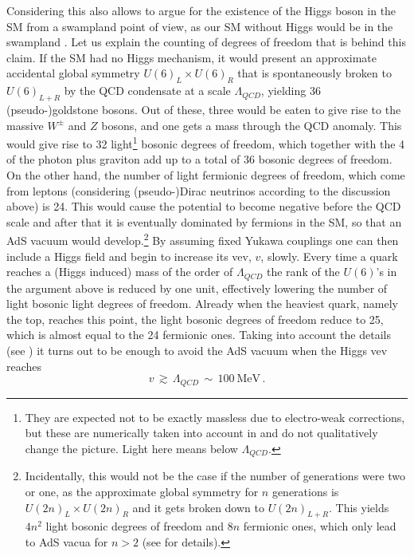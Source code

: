 \documentclass[11pt,a4paper]{article}
\begin{document}
Considering this also allows to argue for the existence of the Higgs boson in the SM from a swampland point of view, as our SM without Higgs would be in the swampland \cite{Gonzalo:2018dxi}. Let us explain the counting of degrees of freedom that is behind this claim. If the SM had no Higgs mechanism, it would present an approximate accidental global symmetry $U(6)_L \times U(6)_R$ that is spontaneously broken to $U(6)_{L+R}$ by the QCD condensate at a scale $\Lambda_{QCD}$, yielding 36 (pseudo-)goldstone bosons. Out of these, three would be eaten to give rise to the massive $W^\pm$ and $Z$ bosons, and one gets a mass through the QCD anomaly. This would give rise to 32 light\footnote{They are expected not to be exactly massless due to electro-weak corrections, but these are numerically taken into account in \cite{Gonzalo:2018dxi} and do not qualitatively change  the picture. Light here means below $\Lambda_{QCD}$.}  bosonic degrees of freedom, which together with the 4 of the photon plus graviton add up to a total of 36 bosonic degrees of freedom. On the other hand, the number of light fermionic degrees of freedom, which come from leptons (considering \mbox{(pseudo-)Dirac} neutrinos according to the discussion above) is 24. This would cause the potential to become negative before the QCD scale and after that it is eventually dominated by fermions in the SM, so that an AdS vacuum would develop.\footnote{Incidentally, this would not be the case if the number of generations were two or one, as the approximate global symmetry for $n$ generations is $U(2n)_L \times U(2n)_R$  and it gets broken down to $U(2n)_{L+R}$. This yields $4n^2$ light bosonic degrees of freedom and $8n$ fermionic ones, which only lead to AdS vacua for $n>2$ (see \cite{Gonzalo:2018dxi} for details).} By assuming fixed Yukawa couplings one can then include a Higgs field and begin to increase its vev, $v$, slowly. Every time a quark reaches a (Higgs induced) mass of the order of $\Lambda_{QCD}$ the rank of the $U(6)$'s in the argument above is reduced by one unit, effectively lowering the number of light bosonic light degrees of freedom. Already when the heaviest quark, namely the top, reaches this point, the light bosonic degrees of freedom reduce to 25, which is almost equal to the 24 fermionic ones. Taking into account the details (see \cite{Gonzalo:2018dxi})  it turns out to be enough to avoid the AdS vacuum when the Higgs vev reaches
\begin{equation}
v\, \gtrsim \, \Lambda_{QCD} \, \sim \, 100 \  \mathrm{MeV}\, .
\end{equation}
\end{document}
